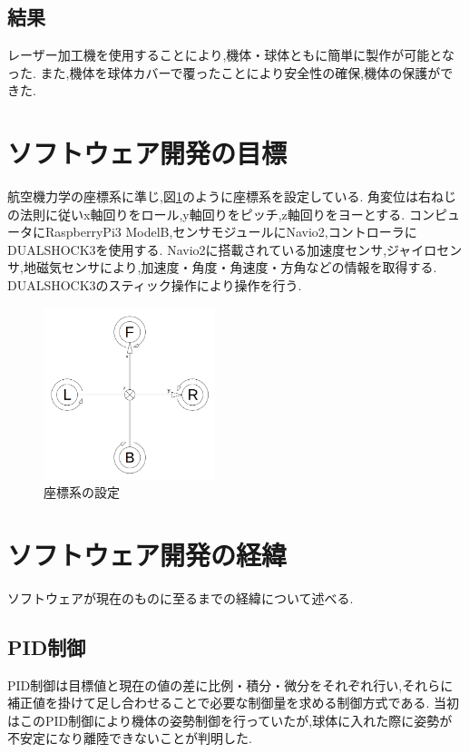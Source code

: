 \documentclass[twocolumn,11pt]{sotsuken_abst}
\begin{document}
\subsection{結果}
レーザー加工機を使用することにより,機体・球体ともに簡単に製作が可能となった.
また,機体を球体カバーで覆ったことにより安全性の確保,機体の保護ができた.


\section{ソフトウェア開発の目標}
航空機力学の座標系\cite{config}に準じ,図\ref{fig:config}のように座標系を設定している.
角変位は右ねじの法則に従いx軸回りをロール,y軸回りをピッチ,z軸回りをヨーとする.
コンピュータにRaspberryPi3 ModelB,センサモジュールにNavio2,コントローラにDUALSHOCK3を使用する.
Navio2に搭載されている加速度センサ,ジャイロセンサ,地磁気センサにより,加速度・角度・角速度・方角などの情報を取得する.
DUALSHOCK3のスティック操作により操作を行う.

\begin{figure}[htbp]
	\begin{center}
		\includegraphics[width=50mm]{image/config.png}
		\caption{座標系の設定}
		\label{fig:config}
	\end{center}
\end{figure}


\section{ソフトウェア開発の経緯}
ソフトウェアが現在のものに至るまでの経緯について述べる.

\subsection{PID制御}
PID制御は目標値と現在の値の差に比例・積分・微分をそれぞれ行い,それらに補正値を掛けて足し合わせることで必要な制御量を求める制御方式である.\cite{pid}
当初はこのPID制御により機体の姿勢制御を行っていたが,球体に入れた際に姿勢が不安定になり離陸できないことが判明した.
\end{document}
